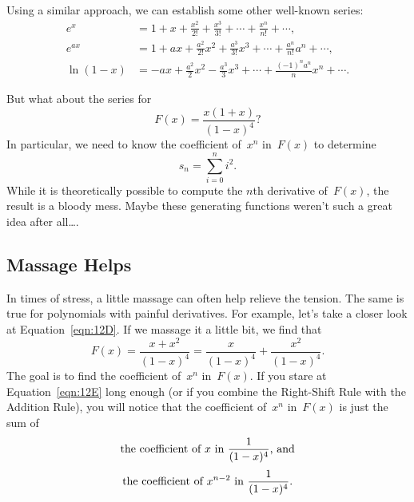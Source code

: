 Using a similar approach, we can establish some other well-known
series:
\begingroup
{}
\begin{align*}
e^x
    &= 1 + x + \frac{x^2}{2!} + \frac{x^3}{3!} + \cdots +
        \frac{x^n}{n!} + \cdots, \\
%
e^{ax}
    &= 1 + ax + \frac{a^2}{2!} x^2 + \frac{a^3}{3!} x^3 + \cdots +
        \frac{a^n}{n!} a^n + \cdots, \\
%
\ln(1 - x)
    &= -a x + \frac{a^2}{2} x^2 - \frac{a^3}{3} x^3 + \cdots 
        + \frac{(-1)^n a^n}{n} x^n + \cdots.
\end{align*}
\endgroup

But what about the series for
\begin{equation}\label{eqn:12D}
    F(x) = \frac{x (1 + x)}{(1 - x)^4} ?
\end{equation}
In particular, we need to know the coefficient of~$x^n$ in~$F(x)$ to
determine
\begin{equation*}
    s_n = \sum_{i = 0}^n i^2.
\end{equation*}
While it is theoretically possible to compute the $n$th derivative
of~$F(x)$, the result is a bloody mess.  Maybe these generating
functions weren't such a great idea after all\dots.

\subsection{Massage Helps}

In times of stress, a little massage can often help relieve the
tension.  The same is true for polynomials with painful derivatives.
For example, let's take a closer look at Equation~\ref{eqn:12D}.  If
we massage it a little bit, we find that
\begin{equation}
F(x)    = \frac{x + x^2}{(1 - x)^4}
        = \frac{x}{(1 - x)^4} + \frac{x^2}{(1 - x)^4}. \label{eqn:12E}
\end{equation}
The goal is to find the coefficient of~$x^n$ in~$F(x)$.  If you stare
at Equation~\ref{eqn:12E} long enough (or if you combine the
Right-Shift Rule with the Addition Rule), you will notice that the
coefficient of~$x^n$ in~$F(x)$ is just the sum of
\begin{gather*}
    \text{the coefficient of~$x$ in $\frac{1}{(1 - x)^4}$, and}
\\[\smallskipamount]
    \text{the coefficient of~$x^{n - 2}$ in $\frac{1}{(1 - x)^4}$}.
\end{gather*}

